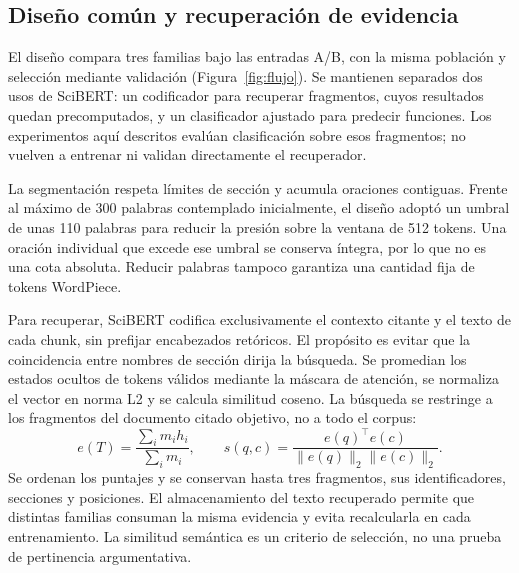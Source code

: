 \documentclass[10pt,a4paper,twocolumn]{article}
\begin{document}
\subsection{Diseño común y recuperación de evidencia}
El diseño compara tres familias bajo las entradas A/B, con la misma población y selección mediante validación (Figura~\ref{fig:flujo}). Se mantienen separados dos usos de SciBERT: un codificador para recuperar fragmentos, cuyos resultados quedan precomputados, y un clasificador ajustado para predecir funciones. Los experimentos aquí descritos evalúan clasificación sobre esos fragmentos; no vuelven a entrenar ni validan directamente el recuperador.

La segmentación respeta límites de sección y acumula oraciones contiguas. Frente al máximo de 300 palabras contemplado inicialmente, el diseño adoptó un umbral de unas 110 palabras para reducir la presión sobre la ventana de 512 tokens. Una oración individual que excede ese umbral se conserva íntegra, por lo que no es una cota absoluta. Reducir palabras tampoco garantiza una cantidad fija de tokens WordPiece.

Para recuperar, SciBERT codifica exclusivamente el contexto citante y el texto de cada chunk, sin prefijar encabezados retóricos. El propósito es evitar que la coincidencia entre nombres de sección dirija la búsqueda. Se promedian los estados ocultos de tokens válidos mediante la máscara de atención, se normaliza el vector en norma L2 y se calcula similitud coseno. La búsqueda se restringe a los fragmentos del documento citado objetivo, no a todo el corpus:
\[
 e(T)=\frac{\sum_i m_i h_i}{\sum_i m_i},\qquad
 s(q,c)=\frac{e(q)^\top e(c)}{\|e(q)\|_2\|e(c)\|_2}.
\]
Se ordenan los puntajes y se conservan hasta tres fragmentos, sus identificadores, secciones y posiciones. El almacenamiento del texto recuperado permite que distintas familias consuman la misma evidencia y evita recalcularla en cada entrenamiento. La similitud semántica es un criterio de selección, no una prueba de pertinencia argumentativa.
\end{document}
